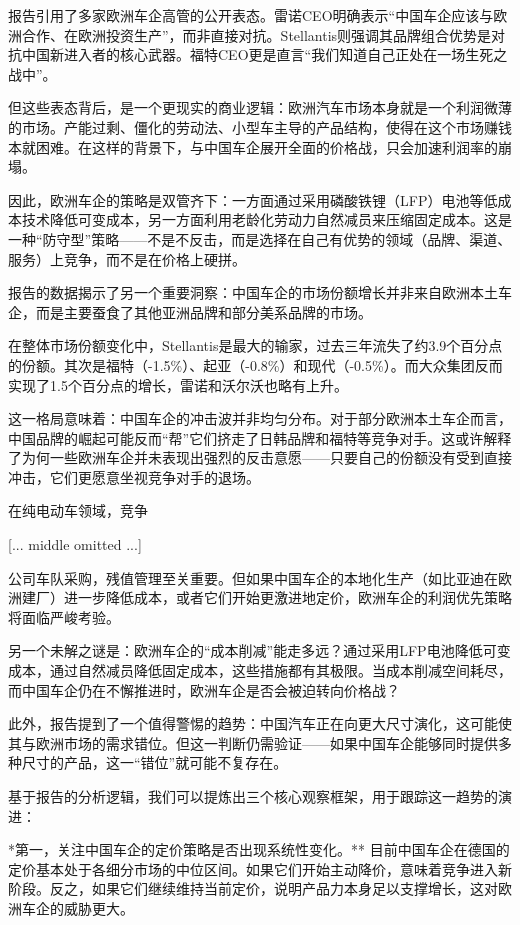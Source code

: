 \documentclass[11pt]{ctexart}
\begin{document}
报告引用了多家欧洲车企高管的公开表态。雷诺CEO明确表示“中国车企应该与欧洲合作、在欧洲投资生产”，而非直接对抗。Stellantis则强调其品牌组合优势是对抗中国新进入者的核心武器。福特CEO更是直言“我们知道自己正处在一场生死之战中”。

但这些表态背后，是一个更现实的商业逻辑：欧洲汽车市场本身就是一个利润微薄的市场。产能过剩、僵化的劳动法、小型车主导的产品结构，使得在这个市场赚钱本就困难。在这样的背景下，与中国车企展开全面的价格战，只会加速利润率的崩塌。

因此，欧洲车企的策略是双管齐下：一方面通过采用磷酸铁锂（LFP）电池等低成本技术降低可变成本，另一方面利用老龄化劳动力自然减员来压缩固定成本。这是一种“防守型”策略——不是不反击，而是选择在自己有优势的领域（品牌、渠道、服务）上竞争，而不是在价格上硬拼。

报告的数据揭示了另一个重要洞察：中国车企的市场份额增长并非来自欧洲本土车企，而是主要蚕食了其他亚洲品牌和部分美系品牌的市场。

在整体市场份额变化中，Stellantis是最大的输家，过去三年流失了约3.9个百分点的份额。其次是福特（-1.5\%）、起亚（-0.8\%）和现代（-0.5\%）。而大众集团反而实现了1.5个百分点的增长，雷诺和沃尔沃也略有上升。

这一格局意味着：中国车企的冲击波并非均匀分布。对于部分欧洲本土车企而言，中国品牌的崛起可能反而“帮”它们挤走了日韩品牌和福特等竞争对手。这或许解释了为何一些欧洲车企并未表现出强烈的反击意愿——只要自己的份额没有受到直接冲击，它们更愿意坐视竞争对手的退场。

在纯电动车领域，竞争

[... middle omitted ...]

公司车队采购，残值管理至关重要。但如果中国车企的本地化生产（如比亚迪在欧洲建厂）进一步降低成本，或者它们开始更激进地定价，欧洲车企的利润优先策略将面临严峻考验。

另一个未解之谜是：欧洲车企的“成本削减”能走多远？通过采用LFP电池降低可变成本，通过自然减员降低固定成本，这些措施都有其极限。当成本削减空间耗尽，而中国车企仍在不懈推进时，欧洲车企是否会被迫转向价格战？

此外，报告提到了一个值得警惕的趋势：中国汽车正在向更大尺寸演化，这可能使其与欧洲市场的需求错位。但这一判断仍需验证——如果中国车企能够同时提供多种尺寸的产品，这一“错位”就可能不复存在。

基于报告的分析逻辑，我们可以提炼出三个核心观察框架，用于跟踪这一趋势的演进：

*第一，关注中国车企的定价策略是否出现系统性变化。** 目前中国车企在德国的定价基本处于各细分市场的中位区间。如果它们开始主动降价，意味着竞争进入新阶段。反之，如果它们继续维持当前定价，说明产品力本身足以支撑增长，这对欧洲车企的威胁更大。
\end{document}
